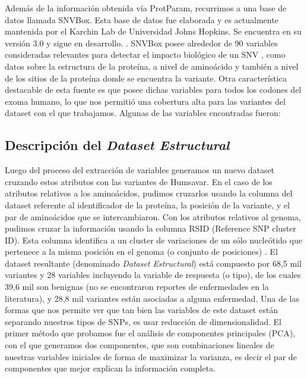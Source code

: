 Además de la información obtenida vía ProtParam, recurrimos a una base de datos llamada SNVBox. Esta base de datos fue elaborada y es actualmente mantenida por el Karchin Lab de Universidad Johns Hopkins. Se encuentra en su versión 3.0 y sigue en desarrollo. . SNVBox posee alrededor de 90 variables consideradas relevantes para detectar el impacto biológico de un SNV \cite{Wong2011}, como datos sobre la estructura de la proteína, a nivel de aminoácido y también a nivel de los sitios de la proteína donde se encuentra la variante. Otra característica destacable de esta fuente es que posee dichas variables para todos los codones del exoma humano, lo que nos permitió una cobertura alta para las variantes del dataset con el que trabajamos.
Algunas de las variables encontradas fueron:

\vspace{2mm}
\vspace{2mm}

\subsection{Descripción del \textit{Dataset Estructural}}

Luego del proceso del extracción de variables generamos un nuevo dataset cruzando estos atributos con las variantes de Humsavar. En el caso de los atributos relativos a los aminoácidos, pudimos cruzarlos usando la columna del dataset referente al identificador de la proteína, la posición de la variante, y el par de aminoácidos que se intercambiaron. Con los atributos relativos al genoma, pudimos cruzar la información usando la columna RSID (Reference SNP cluster ID). Esta columna identifica a un cluster de variaciones de un sólo nucleótido que pertenece a la misma posición en el genoma (o conjunto de posiciones) \cite{Ostell2007}. 
El dataset resultante (denominado \textit{Dataset Estructural}) está compuesto por 68,5 mil variantes y 28 variables incluyendo la variable de respuesta (o tipo), de los cuales 39,6 mil son benignas (no se encontraron reportes de enfermedades en la literatura), y 28,8 mil variantes están asociadas a alguna enfermedad. 
Una de las formas que nos permite ver que tan bien las variables de este dataset están separando nuestros tipos de SNPs, es usar reducción de dimensionalidad. El primer método que probamos fue el análisis de componentes principales (PCA), con el que generamos dos componentes, que son combinaciones lineales de nuestras variables iniciales de forma de maximizar la varianza, es decir el par de componentes que mejor explican la información completa.


